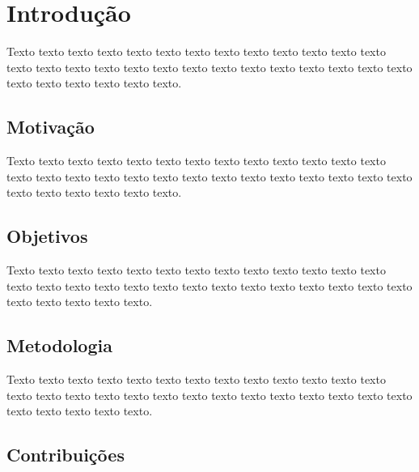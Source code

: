 \chapter{Introdução}
\label{cap:introducao}

Texto texto texto texto texto texto texto texto texto texto texto texto texto
texto texto texto texto texto texto texto texto texto texto texto texto texto
texto texto texto texto texto texto texto.



\section{Motivação}
\label{sec:motivacao}

Texto texto texto texto texto texto texto texto texto texto texto texto texto
texto texto texto texto texto texto texto texto texto texto texto texto texto
texto texto texto texto texto texto texto.


\section{Objetivos}
\label{sec:objetivos}

Texto texto texto texto texto texto texto texto texto texto texto texto texto
texto texto texto texto texto texto texto texto texto texto texto texto texto
texto texto texto texto texto texto.

\section{Metodologia}
\label{sec:metodologia}

Texto texto texto texto texto texto texto texto texto texto texto texto texto
texto texto texto texto texto texto texto texto texto texto texto texto texto
texto texto texto texto texto texto.

\section{Contribuições}
\label{sec:contribucoes}

